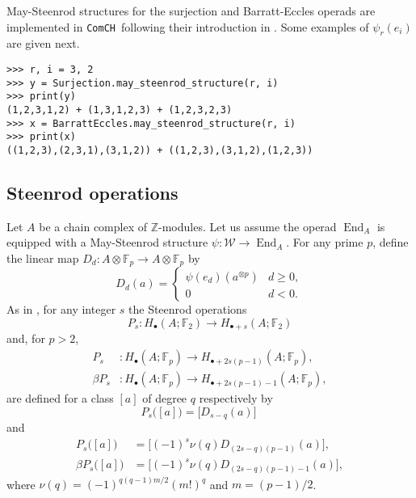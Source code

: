 \documentclass{amsart}
\newcommand{\comch}{\texttt{ComCH}}
\DeclareMathOperator{\End}{End}
\begin{document}
May-Steenrod structures for the surjection and Barratt-Eccles operads are implemented in \comch\, following their introduction in \cite{medina2020maysteenrod}.
Some examples of $\psi_r(e_i)$ are given next.

\begin{Verbatim}[frame=lines, samepage=true]
>>> r, i = 3, 2
>>> y = Surjection.may_steenrod_structure(r, i)
>>> print(y)
(1,2,3,1,2) + (1,3,1,2,3) + (1,2,3,2,3)
>>> x = BarrattEccles.may_steenrod_structure(r, i)
>>> print(x)
((1,2,3),(2,3,1),(3,1,2)) + ((1,2,3),(3,1,2),(1,2,3))
\end{Verbatim}

\subsection{Steenrod operations}

Let $A$ be a chain complex of $\mathbb Z$-modules.
Let us assume the operad $\End_A$ is equipped with a May-Steenrod structure $\psi \colon \mathcal W \to \End_A$.
For any prime $p$, define the linear map $D_d \colon A \otimes \mathbb F_p \to A \otimes \mathbb F_p$ by
\begin{equation*}
D_d(a) = \begin{cases}
\psi(e_d)(a^{\otimes p}) & d \geq 0, \\
0 & d < 0.
\end{cases}
\end{equation*}
As in \cite{May70algebraic}, for any integer $s$ the Steenrod operations
\begin{equation*}
P_s : H_\bullet(A; \mathbb F_2) \to H_{\bullet + s}(A; \mathbb F_2)
\end{equation*}
and, for $p > 2$,
\begin{align*}
P_s & \colon H_\bullet(A; \mathbb F_p) \to H_{\bullet + 2s(p-1)}(A; \mathbb F_p), \\
\beta P_s & \colon H_\bullet(A; \mathbb F_p) \to H_{\bullet + 2s(p-1) - 1}(A; \mathbb F_p),
\end{align*}
are defined for a class $[a]$ of degree $q$ respectively by
\begin{equation*}
P_s\big([a]\big) = \big[D_{s-q}(a)\big] \qquad
\end{equation*}
and
\begin{align*}
P_s\big([a]\big) & = \big[(-1)^s \nu(q) D_{(2s-q)(p-1)}(a)\big], \\
\beta P_s\big([a]\big) & = \big[(-1)^s \nu(q)D_{(2s-q)(p-1)-1}(a)\big],
\end{align*}
where $\nu(q) = (-1)^{q(q-1)m/2}(m!)^q$ and $m = (p-1)/2$.
\end{document}
